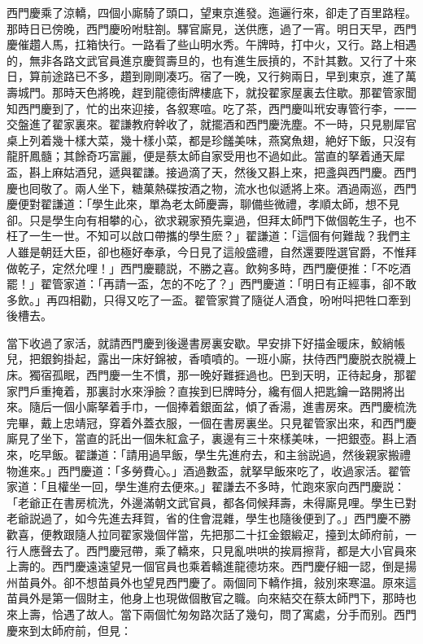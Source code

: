 西門慶乘了涼轎，四個小廝騎了頭口，望東京進發。迤邐行來，卻走了百里路程。那時日已傍晚，西門慶吩咐駐劄。驛官廝見，送供應，過了一宵。明日天早，西門慶催趲人馬，扛箱快行。一路看了些山明水秀。午牌時，打中火，又行。路上相遇的，無非各路文武官員進京慶賀壽旦的，也有進生辰摃的，不計其數。又行了十來日，算前途路已不多，趲到剛剛凑巧。宿了一晚，又行夠兩日，早到東京，進了萬壽城門。那時天色將晚，趕到龍德街牌樓底下，就投翟家屋裏去住歇。那翟管家聞知西門慶到了，忙的出來迎接，各叙寒喧。吃了茶，西門慶叫玳安專管行李，一一交盤進了翟家裏來。翟謙教府幹收了，就擺酒和西門慶洗塵。不一時，只見剔犀官桌上列着幾十樣大菜，幾十樣小菜，都是珍饈美味，燕窝魚翅，絶好下飯，只沒有龍肝鳳髓；其餘奇巧富麗，便是蔡太師自家受用也不過如此。當直的拏着通天犀盃，斟上麻姑酒兒，遞與翟謙。接過滴了天，然後又斟上來，把盞與西門慶。西門慶也囘敬了。兩人坐下，糖菓熱碟按酒之物，流水也似遞將上來。酒過兩巡，西門慶便對翟謙道：「學生此來，單為老太師慶壽，聊備些微禮，孝順太師，想不見卻。只是學生向有相攀的心，欲求親家預先稟過，但拜太師門下做個乾生子，也不枉了一生一世。不知可以啟口帶攜的學生麽？」翟謙道：「這個有何難哉？我們主人雖是朝廷大臣，卻也極好奉承，今日見了這般盛禮，自然還要陞選官爵，不惟拜做乾子，定然允哩！」西門慶聽説，不勝之喜。飲夠多時，西門慶便推：「不吃酒罷！」翟管家道：「再請一盃，怎的不吃了？」西門慶道：「明日有正經事，卻不敢多飲。」再四相勸，只得又吃了一盃。翟管家賞了隨従人酒食，吩咐呌把牲口牽到後槽去。

當下收過了家活，就請西門慶到後邊書房裏安歇。早安排下好描金暖床，鮫綃帳兒，把銀鉤掛起，露出一床好錦被，香噴噴的。一班小廝，扶侍西門慶脱衣脱襪上床。獨宿孤眠，西門慶一生不慣，那一晚好難捱過也。巴到天明，正待起身，那翟家門戶重掩着，那裏討水來淨臉？直挨到巳牌時分，纔有個人把匙鑰一路開將出來。隨后一個小廝拏着手巾，一個捧着銀面盆，傾了香湯，進書房來。西門慶梳洗完畢，戴上忠靖冠，穿着外蓋衣服，一個在書房裏坐。只見翟管家出來，和西門慶廝見了坐下，當直的託出一個朱紅盒子，裏邊有三十來樣美味，一把銀壺。斟上酒來，吃早飯。翟謙道：「請用過早飯，學生先進府去，和主翁説過，然後親家搬禮物進來。」西門慶道：「多勞費心。」酒過數盃，就拏早飯來吃了，收過家活。翟管家道：「且權坐一回，學生進府去便來。」翟謙去不多時，忙跑來家向西門慶説：「老爺正在書房梳洗，外邊滿朝文武官員，都各伺候拜壽，未得廝見哩。學生已對老爺説過了，如今先進去拜賀，省的住會混雜，學生也隨後便到了。」西門慶不勝歡喜，便教跟隨人拉同翟家幾個伴當，先把那二十扛金銀緞疋，擡到太師府前，一行人應聲去了。西門慶冠帶，乘了轎來，只見亂哄哄的挨肩擦背，都是大小官員來上壽的。西門慶遠遠望見一個官員也乘着轎進龍德坊來。西門慶仔細一認，倒是揚州苗員外。卻不想苗員外也望見西門慶了。兩個同下轎作揖，敍別來寒温。原來這苗員外是第一個財主，他身上也現做個散官之職。向來結交在蔡太師門下，那時也來上壽，恰遇了故人。當下兩個忙匆匆路次話了幾句，問了寓處，分手而别。西門慶來到太師府前，但見：

